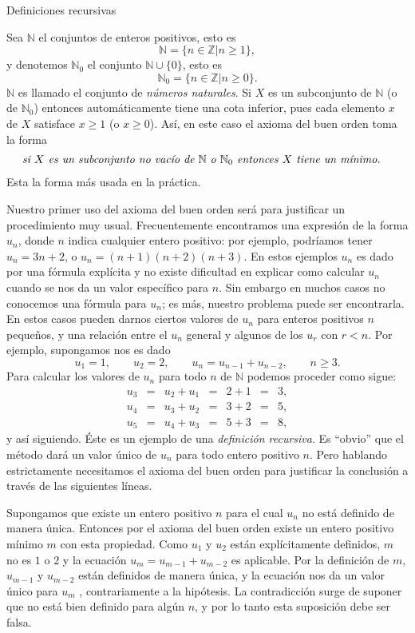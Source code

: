 \begin{section}{Definiciones recursivas}\label{1.3}

Sea $\mathbb N$ el conjuntos de enteros positivos, esto es
$$
\mathbb N = \{ n \in \mathbb Z | n\ge 1\},
$$
y denotemos $\mathbb N_0$ el conjunto $\mathbb N \cup \{0\}$, esto
es
$$
\mathbb N_0 = \{ n \in \mathbb Z | n\ge 0\}.
$$
$\mathbb{N}$  es llamado el conjunto de  \textit{números naturales}. Si $X$ es un subconjunto de $\mathbb N$ (o de $\mathbb N_0$)
 entonces automáticamente tiene una cota
inferior, pues cada elemento $x$ de $X$ satisface $x\ge 1$ (o
$x\ge 0$). As{í}, en este caso el axioma del buen orden toma la
forma
$$
\begin{aligned}
&\text{\it si $X$ es un subconjunto no vacío de $\mathbb N$ o $\mathbb N_0$ entonces $X$
 tiene un mínimo.}
\end{aligned}
$$
Esta la forma más usada en la práctica.

Nuestro primer uso del axioma del buen orden será para justificar
un procedimiento muy usual. Frecuentemente encontramos una
expresión de la forma $u_n$, donde $n$ indica cualquier entero
positivo: por ejemplo, podríamos tener $u_n=3n+2$, o $u_n =
(n+1)(n+2)(n+3)$. En estos ejemplos $u_n$ es dado por una fórmula
explícita y no existe dificultad en explicar como calcular $u_n$
cuando se nos da un valor específico para $n$. Sin embargo en
muchos casos no conocemos una fórmula para $u_n$; es más, nuestro
problema puede ser encontrarla. En estos casos pueden darnos
ciertos valores de $u_n$ para enteros positivos $n$ peque\~nos, y
una relación entre el $u_n$ general y algunos de los $u_r$ con
$r<n$. Por ejemplo, supongamos nos es dado $$ u_1=1, \qquad u_2=2,
\qquad u_n =u_{n-1} +u_{n-2}, \qquad n\ge 3.
$$
Para calcular los valores de $u_n$ para todo $n$ de $\mathbb N$
podemos proceder como sigue:
$$
\begin{matrix}
u_3 & = & u_2 + u_1 & = & 2+1 &=& 3, \\
u_4 & = & u_3 + u_2 & = & 3+2 &=& 5, \\
u_5 & = & u_4 + u_3 & = & 5+3 &=& 8,
\end{matrix}
$$
y así siguiendo.
 Éste es un ejemplo de una {\it definición recursiva}. Es ``obvio'' que el
método dará un valor único de $u_n$ para todo entero positivo $n$.
Pero hablando estrictamente necesitamos el axioma del buen orden
para justificar la conclusión a través de las siguientes líneas.

Supongamos que existe un entero positivo $n$ para el cual $u_n$ no
está definido de manera única. Entonces por el axioma del buen
orden existe un entero positivo mínimo $m$ con esta propiedad.
Como $u_1$ y $u_2$ están explícitamente definidos, $m$ no es $1$ o $2$
y la ecuación $u_m =u_{m-1} +u_{m-2}$ es aplicable. Por la
definición de $m$, $u_{m-1}$ y $u_{m-2}$ están definidos de manera
única, y la ecuación nos da un valor único para $u_m$ ,
contrariamente a la hipótesis. La contradicción surge de suponer
que no está bien definido para algún $n$, y por lo tanto esta
suposición debe ser falsa.


\end{section}
